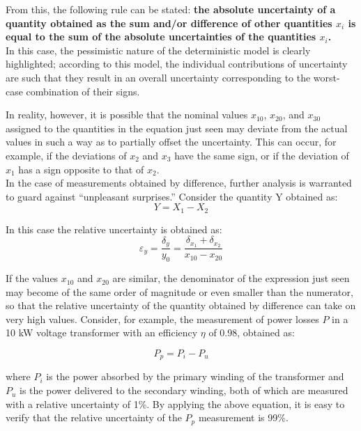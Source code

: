 \documentclass[../main.tex]{subfiles}
\begin{document}
From this, the following rule can be stated: \textbf{the absolute uncertainty of a quantity obtained as the sum and/or difference of other quantities $x_i$ is equal to the sum of the absolute uncertainties of the quantities $x_i$.}\\

In this case, the pessimistic nature of the deterministic model is clearly highlighted; according to this model, the individual contributions of uncertainty are such that they result in an overall uncertainty corresponding to the worst-case combination of their signs. 

In reality, however, it is possible that the nominal values $x_{10}$, $x_{20}$, and $x_{30}$ assigned to the quantities in the equation just seen may deviate from the actual values in such a way as to partially offset the uncertainty. This can occur, for example, if the deviations of $x_2$ and $x_3$ have the same sign, or if the deviation of $x_1$ has a sign opposite to that of $x_2$.\\

In the case of measurements obtained by difference, further analysis is warranted to guard against “unpleasant surprises.” 
Consider the quantity Y obtained as:\\

\begin{equation}
	Y = X_1 - X_2
\end{equation}

In this case the relative uncertainty is obtained as:\\

\begin{equation}
	\varepsilon_y = \frac{\delta_y}{y_0} = \frac{\delta_{x_1} + \delta_{x_2}}{x_{10} - x_{20}}
\end{equation}

If the values $x_{10}$ and $x_{20}$ are similar, the denominator of the expression just seen may become of the same order of magnitude or even smaller than the numerator, so that the relative uncertainty of the quantity obtained by difference can take on very high values. Consider, for example, the measurement of power losses $P$ in a 10 kW voltage transformer with an efficiency $\eta$ of 0.98, obtained as:

\begin{equation}
	P_p = P_i - P_u	
\end{equation}


where $P_i$ is the power absorbed by the primary winding of the transformer and $P_u$ is the power delivered to the secondary winding, both of which are measured with a relative uncertainty of 1\%. By applying the above equation, it is easy to verify that the relative uncertainty of the $P_p$ measurement is 99\%.
\end{document}
